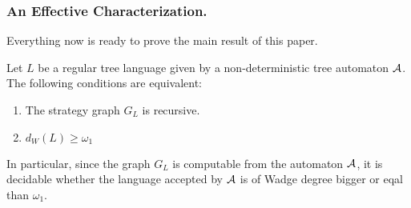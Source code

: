 \subsubsection*{An Effective Characterization.}
\label{sec:the main result}
Everything now is ready to prove the main result of this paper.
\begin{theorem}\label{theorem:main}
Let $L$ be a regular tree language given by a non-deterministic tree automaton ${\mathcal A}$. The following conditions are equivalent:
\begin{enumerate}
\item The strategy graph $G_L$ is recursive.
\item $d_W(L) \geq \omega_1$
\end{enumerate}
In particular, since the graph $G_L$ is computable from the automaton ${\mathcal A}$, it is decidable whether the language accepted by ${\mathcal A}$ is of Wadge degree bigger or eqal than $\omega_1$.  
\end{theorem}
